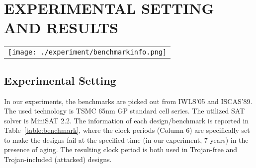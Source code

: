 \section{EXPERIMENTAL SETTING AND RESULTS}
\label{sec:mot}

\begin{table*}
\centering
\caption{Benchmark information and average probabilities of Monte-Carlo instances}
	\begin{tabular}{l}
	\texttt{[image: ./experiment/benchmarkinfo.png]}
	\end{tabular}
\label{table:benchmark}
\end{table*}

\begin{figure*}[!ht]
    \centering
    \caption{Lifetime distributions of Monte-Carlo Instances of Trojan-included \textit{s38417}, \textit{des\_perf}, and \textit{leo3mp}}
    \label{fig:exp}
\end{figure*}

\subsection{Experimental Setting}
\label{sec:exp:tc}
In our experiments, the benchmarks are picked out from IWLS'05 and ISCAS'89. The used technology is TSMC 65nm GP standard cell series. The utilized SAT solver is MiniSAT 2.2. The information of each design/benchmark is reported in Table~\ref{table:benchmark}, where the clock periods (Column 6) are specifically set to make the designs fail at the specified time (in our experiment, 7 years) in the presence of aging. The resulting clock period is both used in Trojan-free and Trojan-included (attacked) designs. 
